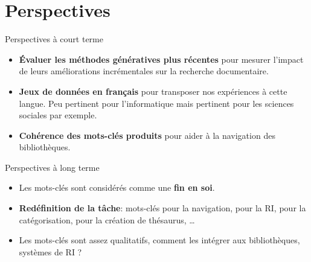 \section*{Perspectives}

\begin{frame}{}
    \sectionpage
\end{frame}

\begin{frame}{Perspectives à court terme}
    \begin{itemize}
    \item \textbf{Évaluer les méthodes génératives plus récentes} pour mesurer l'impact de leurs améliorations incrémentales sur la recherche documentaire.

    \item \textbf{Jeux de données en français} pour transposer nos expériences à cette langue. Peu pertinent pour l'informatique mais pertinent pour les sciences sociales par exemple.
    
    \item \textbf{Cohérence des mots-clés produits} pour aider à la navigation des bibliothèques.
    
    \end{itemize}
\end{frame}

\begin{frame}{Perspectives à long terme}
    \begin{itemize}
    \item Les mots-clés sont considérés comme une \textbf{fin en soi}.
    \item \textbf{Redéfinition de la tâche}: mots-clés pour la navigation, pour la RI, pour la catégorisation, pour la création de thésaurus, \ldots
    
    \item Les mots-clés sont assez qualitatifs, comment les intégrer aux bibliothèques, systèmes de RI ?
    \end{itemize}

\end{frame}